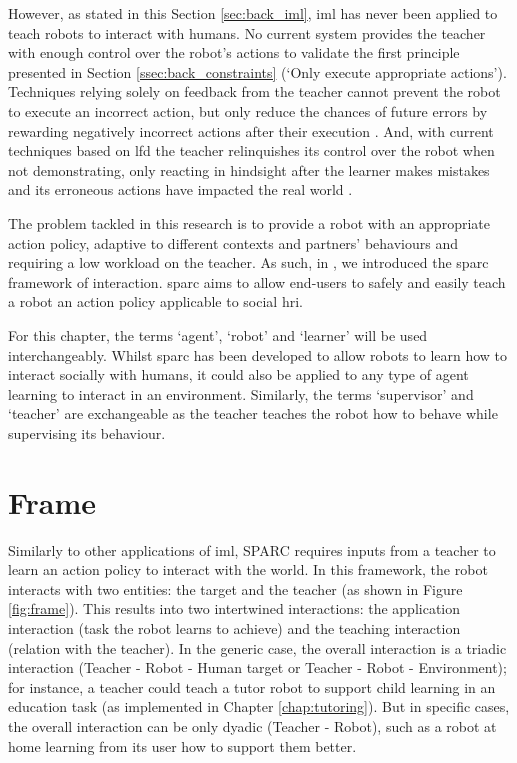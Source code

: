 However, as stated in this Section \ref{sec:back_iml}, \gls{iml} has never been applied to teach robots to interact with humans. No current system provides the teacher with enough control over the robot's actions to validate the first principle presented in Section \ref{ssec:back_constraints} (`Only execute appropriate actions'). Techniques relying solely on feedback from the teacher cannot prevent the robot to execute an incorrect action, but only reduce the chances of future errors by rewarding negatively incorrect actions after their execution \citep{senft2017supervised}. And, with current techniques based on \gls{lfd} the teacher relinquishes its control over the robot when not demonstrating, only reacting in hindsight after the learner makes mistakes and its erroneous actions have impacted the real world \citep{chernova2009interactive}.

The problem tackled in this research is to provide a robot with an appropriate action policy, adaptive to different contexts and partners' behaviours and requiring a low workload on the teacher. As such, in \cite{senft2015sparc}, we introduced the \gls{sparc} framework of interaction. \gls{sparc} aims to allow end-users to safely and easily teach a robot an action policy applicable to social \gls{hri}.

For this chapter, the terms `agent', `robot' and `learner' will be used interchangeably. Whilst \gls{sparc} has been developed to allow robots to learn how to interact socially with humans, it could also be applied to any type of agent learning to interact in an environment. Similarly, the terms `supervisor' and `teacher' are exchangeable as the teacher teaches the robot how to behave while supervising its behaviour.

\section{Frame}

Similarly to other applications of \gls{iml}, SPARC requires inputs from a teacher to learn an action policy to interact with the world. In this framework, the robot interacts with two entities: the target and the teacher (as shown in Figure \ref{fig:frame}). This results into two intertwined interactions: the application interaction (task the robot learns to achieve) and the teaching interaction (relation with the teacher). In the generic case, the overall interaction is a triadic interaction (Teacher - Robot - Human target or Teacher - Robot - Environment); for instance, a teacher could teach a tutor robot to support child learning in an education task (as implemented in Chapter \ref{chap:tutoring}). But in specific cases, the overall interaction can be only dyadic (Teacher - Robot), such as a robot at home learning from its user how to support them better.

